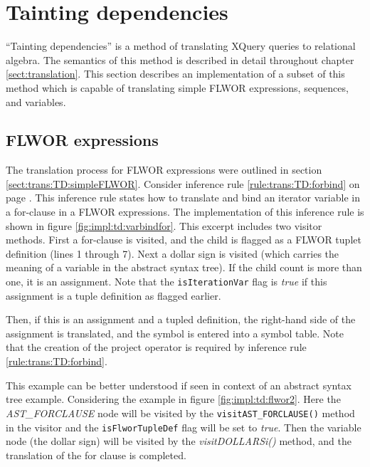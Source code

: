 \section{Tainting dependencies}
\label{sect:impl:tainting_deps}
``Tainting dependencies'' is a method of translating XQuery queries to
relational algebra. The semantics of this method is described in detail
throughout chapter \ref{sect:translation}. This section
describes an implementation of a subset of this method which is capable of
translating simple FLWOR expressions, sequences, and variables. 

\subsection{FLWOR expressions}
The translation process for FLWOR expressions were outlined in section
\ref{sect:trans:TD:simpleFLWOR}. Consider inference rule
\ref{rule:trans:TD:forbind} on page \pageref{rule:trans:TD:forbind}. This
inference rule states how to translate and bind an iterator variable in a
for-clause in a FLWOR expressions. The implementation of this inference rule is
shown in figure \ref{fig:impl:td:varbindfor}. This excerpt includes two visitor
methods. First a for-clause is visited, and the child is flagged as a FLWOR
tuplet definition (lines 1 through 7). Next a dollar sign is visited (which
carries the meaning of a variable in the abstract syntax tree). If the child
count is more than one, it is an assignment. Note that the
\texttt{isIterationVar} flag is \textit{true} if this assignment is a tuple
definition as flagged earlier.

Then, if this is an assignment and a tupled definition, the right-hand side of
the assignment is translated, and the symbol is entered into a symbol table.
Note that the creation of the project operator is required by inference rule
\ref{rule:trans:TD:forbind}.

This example can be better understood if seen in context of an abstract syntax
tree example. Considering the example in figure \ref{fig:impl:td:flwor2}. Here
the \textit{AST\_FORCLAUSE} node will be visited by the
\texttt{visitAST\_FORCLAUSE()} method in the visitor and the
\texttt{isFlworTupleDef} flag will be set to \textit{true}. Then the variable
node (the dollar sign) will be visited by the \textit{visitDOLLARSi()} method,
and the translation of the for clause is completed.

